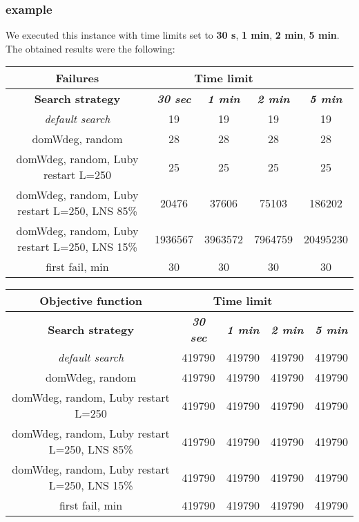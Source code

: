 \subsubsection{example}
We executed this instance with time limits set to \textbf{30 s}, \textbf{1 min}, \textbf{2 min}, \textbf{5 min}.\\
The obtained results were the following:
{
\renewcommand{\arraystretch}{2}
\begin{longtable}[h]{| c | c | c | c | c |}
    \hline
    \textbf{Failures} & \multicolumn{3}{c}{Time limit} & \\
    \hline
    \textbf{Search strategy} & \textbf{\textit{30 sec}} & \textbf{\textit{1 min}} & \textbf{\textit{2 min}} & \textbf{\textit{5 min}} \\
    \hline
    \endhead
    \textit{default search}                       &      19 &      19 &      19 &       19 \\
    \hline
    domWdeg, random                               &      28 &      28 &      28 &       28 \\
    \hline
    domWdeg, random, Luby restart L=250           &      25 &      25 &      25 &       25 \\
    \hline
    domWdeg, random, Luby restart L=250, LNS 85\% &   20476 &   37606 &   75103 &   186202 \\
    \hline
    domWdeg, random, Luby restart L=250, LNS 15\% & 1936567 & 3963572 & 7964759 & 20495230 \\
    \hline
    first fail, min                               &      30 &      30 &      30 &       30 \\
    \hline
\end{longtable}
}

{
\renewcommand{\arraystretch}{2}
\begin{longtable}[h]{| c | c | c | c | c |}
    \hline
    \textbf{Objective function} & \multicolumn{3}{c}{Time limit} & \\
    \hline
    \textbf{Search strategy} & \textbf{\textit{30 sec}} & \textbf{\textit{1 min}} & \textbf{\textit{2 min}} & \textbf{\textit{5 min}} \\
    \hline
    \endhead
    \textit{default search}                       & 419790 & 419790 & 419790 & 419790 \\
    \hline
    domWdeg, random                               & 419790 & 419790 & 419790 & 419790 \\
    \hline
    domWdeg, random, Luby restart L=250           & 419790 & 419790 & 419790 & 419790 \\
    \hline
    domWdeg, random, Luby restart L=250, LNS 85\% & 419790 & 419790 & 419790 & 419790 \\
    \hline
    domWdeg, random, Luby restart L=250, LNS 15\% & 419790 & 419790 & 419790 & 419790 \\
    \hline
    first fail, min                               & 419790 & 419790 & 419790 & 419790 \\
    \hline
\end{longtable}
}